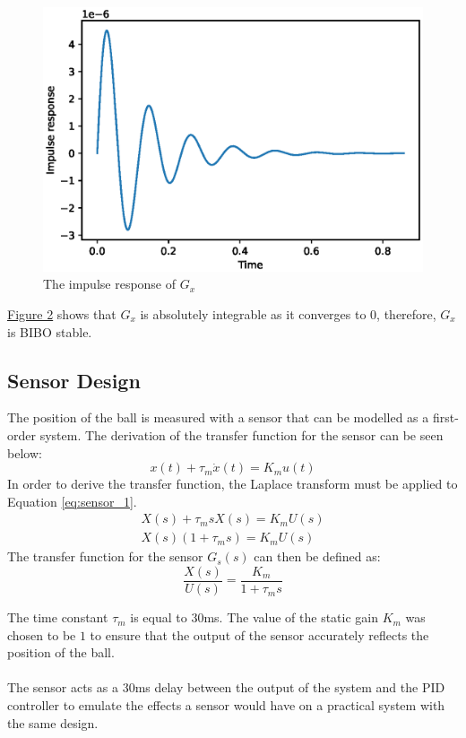 \documentclass[a4paper,10pt,reqno]{amsart}
\numberwithin{equation}{section}
\begin{document}
\begin{figure}[h]
\centering
\includegraphics[width=0.6\linewidth]{g-x-impulse.eps}
\caption{The impulse response of $G_x$}
\label{fig:no-pid-impulse}
\end{figure}
\hyperref[fig:no-pid-impulse]{Figure 2} shows that $G_x$ is absolutely integrable as it converges to 0, therefore, $G_x$ is BIBO stable.

\subsection{Sensor Design}
The position of the ball is measured with a sensor that can be modelled as a first-order system. The derivation of the transfer function for the sensor can be seen below:
\begin{equation}
\label{eq:sensor_1}
    x(t)+\tau_m\dot x(t)=K_mu(t)
\end{equation}
In order to derive the transfer function, the Laplace transform must be applied to Equation \eqref{eq:sensor_1}.
\begin{align*}
    X(s)+\tau_msX(s)=K_mU(s) \\
    X(s)(1+\tau_ms)=K_mU(s)
\end{align*}
The transfer function for the sensor $G_s(s)$ can then be defined as:
\begin{equation}
    \frac{X(s)}{U(s)}=\frac{K_m}{1+\tau_ms}
\end{equation}

The time constant $\tau_m$ is equal to 30ms. The value of the static gain $K_m$ was chosen to be $1$ to ensure that the output of the sensor accurately reflects the position of the ball. \\ \\ 
The sensor acts as a 30ms delay between the output of the system and the PID controller to emulate the effects a sensor would have on a practical system with the same design. 
\end{document}
